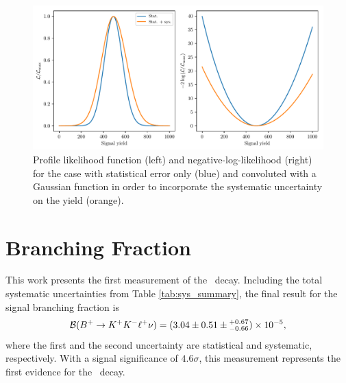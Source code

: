 \begin{figure}[H]
	\centering
	\captionsetup{width=0.8\linewidth}
	\includegraphics[width=\linewidth]{fig/significance}
	\caption{Profile likelihood function (left) and negative-log-likelihood (right) for the case with statistical error only (blue) and convoluted with a Gaussian function in order to incorporate the systematic uncertainty on the yield (orange).}
	\label{fig:significance}
\end{figure}


\section{Branching Fraction}

This work presents the first measurement of the \decayb~decay. Including the total systematic uncertainties from Table \ref{tab:sys_summary}, the final result for the signal branching fraction is
\begin{equation}
\mathcal{B}(B^+ \to K^+ K^- \ell^+ \nu) = (3.04 \pm 0.51 \pm {}^{+0.67}_{-0.66})\times 10^{-5},
\end{equation}
where the first and the second uncertainty are statistical and systematic, respectively. With a signal significance of $4.6\sigma$, this measurement represents the first evidence for the \decayb~decay.

